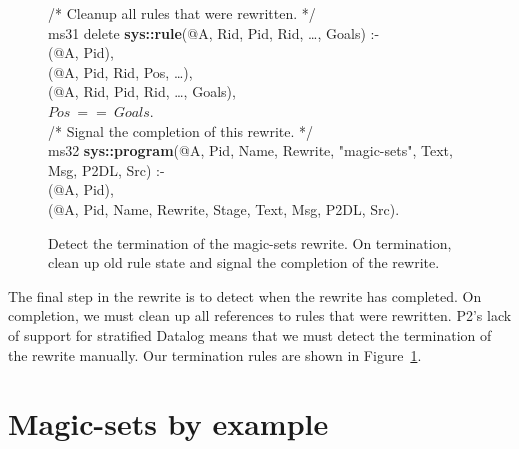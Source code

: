 \begin{figure}[!t]
\begin{boxedminipage}{\linewidth}
/* Cleanup all rules that were rewritten. */ \\
ms31 delete {\bf sys::rule}(@A, Rid, Pid, Rid, \ldots, Goals) :- \\
(@A, Pid), \\
(@A, Pid, Rid, Pos, \ldots), \\
(@A, Rid, Pid, Rid, \ldots, Goals), \\
\datalogspace $Pos\ ==\ Goals$. \\

/* Signal the completion of this rewrite. */ \\
ms32 {\bf sys::program}(@A, Pid, Name, Rewrite, "magic-sets", Text, Msg, P2DL, Src) :- \\
(@A, Pid), \\
(@A, Pid, Name, Rewrite, Stage, Text, Msg, P2DL, Src).

\end{boxedminipage}
\caption{\label{ch:magic:fig:rewrite7} Detect the termination of the magic-sets rewrite. 
On termination, clean up old rule state and signal the completion of the rewrite.}
\end{figure}

The final step in the rewrite is to detect when the rewrite has completed.  On
completion, we must clean up all references to rules that were rewritten.  P2's
lack of support for stratified Datalog means that we must detect the
termination of the rewrite manually.  Our termination rules are shown in
Figure~\ref{ch:magic:fig:rewrite7}.


\section{Magic-sets by example}


